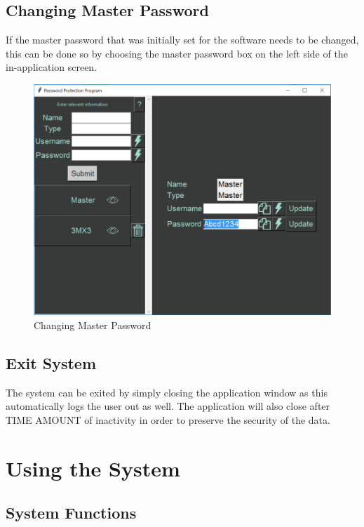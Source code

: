 \documentclass[12pt, titlepage]{article}
\begin{document}
\subsection{Changing Master Password} \label{ChangeMasPass}

If the master password that was initially set for the software needs to be changed, this can be done so by choosing the master password box on the left side of the in-application screen.

\begin{figure}[h]
	\includegraphics[scale=0.3]{images/ChangeMasPass.png}
	\caption{Changing Master Password}
	\label{fig:chMasPass}
\end{figure}


\subsection{Exit System} \label{SysExit}

The system can be exited by simply closing the application window as this automatically logs the user out as well. The application will also close after TIME AMOUNT of inactivity in order to preserve the security of the data.


\section{Using the System} \label{SysUse}


\subsection{System Functions} \label{SysFunc}
\end{document}
